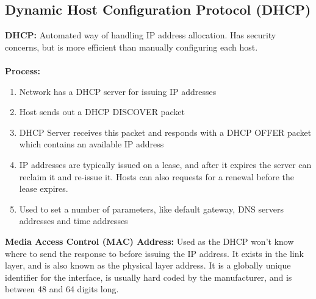\documentclass[a4paper,10pt]{article}
\begin{document}
\subsection{Dynamic Host Configuration Protocol (DHCP)}
\textcolor{RubineRed}{\textbf{DHCP:}} Automated way of handling IP address allocation. Has security concerns, but is more efficient than manually configuring each host. \\\\
\textcolor{RubineRed}{\textbf{Process:}}
\begin{enumerate}
	\item Network has a DHCP server for issuing IP addresses 
	\item Host sends out a DHCP DISCOVER packet
	\item DHCP Server receives this packet and responds with a DHCP OFFER packet which contains an available IP address 
	\item IP addresses are typically issued on a lease, and after it expires the server can reclaim it and re-issue it. Hosts can also requests for a renewal before the lease expires. 
	\item Used to set a number of parameters, like default gateway, DNS servers addresses and time addresses
\end{enumerate}
\textcolor{RubineRed}{\textbf{Media Access Control (MAC) Address:}} Used as the DHCP won't know where to send the response to before issuing the IP address. It exists in the link layer, and is also known as the physical layer address. It is a globally unique identifier for the interface, is usually hard coded by the manufacturer, and is between 48 and 64 digits long. 
\end{document}
